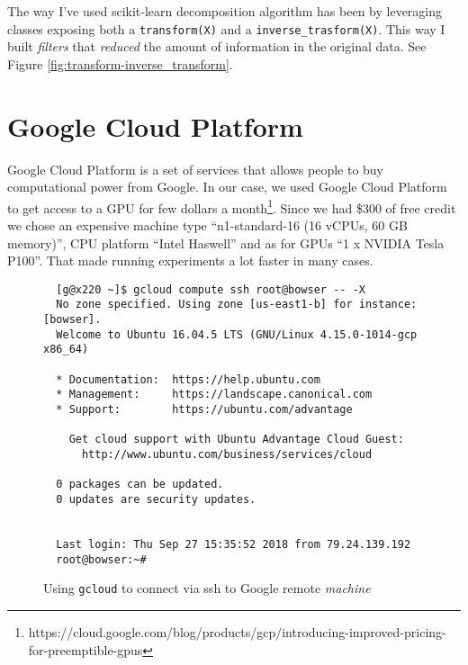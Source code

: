 The way I've used scikit-learn decomposition algorithm has been by
leveraging classes exposing both a \texttt{transform(X)} and a
\texttt{inverse\_trasform(X)}. This way I built \emph{filters} that
\emph{reduced} the amount of information in the original data. See
Figure \ref{fig:transform-inverse_transform}.

\section{Google Cloud Platform}
\label{sec:google-cloud-platform}

Google Cloud Platform is a set of services that allows people to buy
computational power from Google. In our case, we used Google Cloud
Platform to get access to a GPU for few dollars a
month\footnote{https://cloud.google.com/blog/products/gcp/introducing-improved-pricing-for-preemptible-gpus}.
Since we had \$300 of free credit we chose an expensive machine type
``n1-standard-16 (16 vCPUs, 60 GB memory)'', CPU platform ``Intel%
Haswell'' and as for GPUs ``1 x NVIDIA Tesla P100''. That made running
experiments a lot faster in many cases.

\begin{figure}
  \begin{verbatim}
  [g@x220 ~]$ gcloud compute ssh root@bowser -- -X
  No zone specified. Using zone [us-east1-b] for instance: [bowser].
  Welcome to Ubuntu 16.04.5 LTS (GNU/Linux 4.15.0-1014-gcp x86_64)

  * Documentation:  https://help.ubuntu.com
  * Management:     https://landscape.canonical.com
  * Support:        https://ubuntu.com/advantage

    Get cloud support with Ubuntu Advantage Cloud Guest:
      http://www.ubuntu.com/business/services/cloud

  0 packages can be updated.
  0 updates are security updates.


  Last login: Thu Sep 27 15:35:52 2018 from 79.24.139.192
  root@bowser:~# 
  \end{verbatim}
  \caption{Using \texttt{gcloud} to connect via ssh to Google remote \emph{machine}}
\end{figure}
